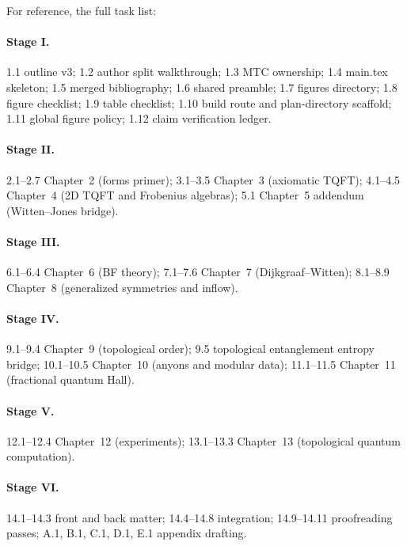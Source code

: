 \documentclass[11pt]{article}
\begin{document}
For reference, the full task list:

\paragraph{Stage I.} 1.1 outline v3; 1.2 author split walkthrough; 1.3 MTC ownership;
1.4 main.tex skeleton; 1.5 merged bibliography; 1.6 shared preamble; 1.7 figures
directory; 1.8 figure checklist; 1.9 table checklist; 1.10 build route and
plan-directory scaffold; 1.11 global figure policy; 1.12 claim verification ledger.

\paragraph{Stage II.} 2.1--2.7 Chapter~2 (forms primer);
3.1--3.5 Chapter~3 (axiomatic TQFT);
4.1--4.5 Chapter~4 (2D TQFT and Frobenius algebras);
5.1 Chapter~5 addendum (Witten--Jones bridge).

\paragraph{Stage III.} 6.1--6.4 Chapter~6 (BF theory);
7.1--7.6 Chapter~7 (Dijkgraaf--Witten);
8.1--8.9 Chapter~8 (generalized symmetries and inflow).

\paragraph{Stage IV.} 9.1--9.4 Chapter~9 (topological order);
 9.5 topological entanglement entropy bridge;
10.1--10.5 Chapter~10 (anyons and modular data);
11.1--11.5 Chapter~11 (fractional quantum Hall).

\paragraph{Stage V.} 12.1--12.4 Chapter~12 (experiments);
13.1--13.3 Chapter~13 (topological quantum computation).

\paragraph{Stage VI.} 14.1--14.3 front and back matter;
14.4--14.8 integration; 14.9--14.11 proofreading passes;
A.1, B.1, C.1, D.1, E.1 appendix drafting.
\end{document}
